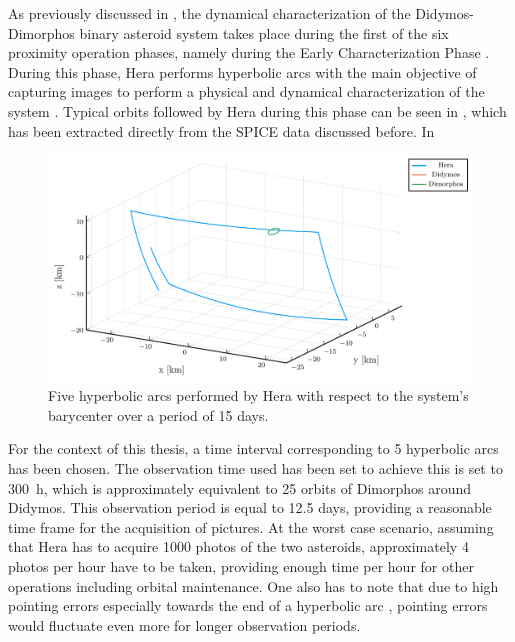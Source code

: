 As previously discussed in , the dynamical characterization of the Didymos-Dimorphos binary asteroid system takes place during the first of the six proximity operation phases, namely during the Early Characterization Phase \cite{hera-autonomous-ops}. During this phase, Hera performs hyperbolic arcs with the main objective of capturing images to perform a physical and dynamical characterization of the system \cite{hera-autonomous-ops}. Typical orbits followed by Hera during this phase can be seen in , which has been extracted directly from the SPICE data discussed before. In 

\begin{figure}[h]
	\centering
	\includegraphics[width=\textwidth]{Figures/Chapter2/ECP_extended_reference_plot.pdf}
	\caption{Five hyperbolic arcs performed by Hera with respect to the system's barycenter over a period of 15 days.}
	\label{fig:hera_extended_orbit}
\end{figure}

For the context of this thesis, a time interval corresponding to 5 hyperbolic arcs has been chosen. The observation time used has been set to achieve this is set to \si{300 \hour}, which is approximately equivalent to 25 orbits of Dimorphos around Didymos. This observation period is equal to \num{12.5} days, providing a reasonable time frame for the acquisition of pictures. At the worst case scenario, assuming that Hera has to acquire \num{1000} photos of the two asteroids, approximately \num{4} photos per hour have to be taken, providing enough time per hour for other operations including orbital maintenance. One also has to note that due to high pointing errors especially towards the end of a hyperbolic arc \cite{hera-adcs}, pointing errors would fluctuate even more for longer observation periods. 


